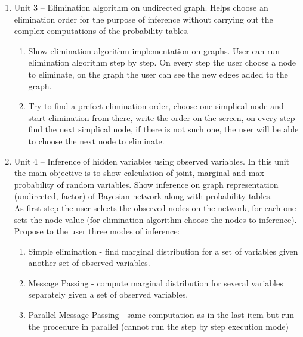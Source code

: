\documentclass{article}
\newcommand{\comment}[2]{
	\todo[color=GreenYellow,inline]{
		\underline{\textbf{#1:}} #2
	}}
\begin{document}
\begin{enumerate}
        \item Unit 3\label{unit3} -- 
            Elimination algorithm on undirected graph. Helps choose an elimination order for the purpose of inference without carrying out the complex computations of the probability tables.
        \begin{enumerate}
            \item Show elimination algorithm implementation on graphs. User can run elimination algorithm step by step. On every step the user choose a node to eliminate, on the graph the user can see the new edges added to the graph.
            \item Try to find a prefect elimination order, choose one simplical node and start elimination from there, write the order on the screen, on every step find the next simplical node, if there is not such one, the user will be able to choose the next node to eliminate.
        \end{enumerate}
        \item Unit 4 --
            Inference of hidden variables using observed variables. In this unit the main objective is to show calculation of joint, marginal and max probability of random variables. Show inference on graph representation (undirected, factor) of Bayesian network along with probability tables.\\

            As first step the user selects the observed nodes on the network, for each one sets the node value (for elimination algorithm choose the nodes to inference).\\

            Propose to the user three modes of inference:
            \begin{enumerate}
                \item Simple elimination - find marginal distribution for a set of variables given another set of observed variables.
                \item Message Passing - compute marginal distribution for several variables separately given a set of observed variables.
                \item Parallel Message Passing - same computation as in the last item but run the procedure in parallel (cannot run the step by step execution mode)
            \end{enumerate}


\end{enumerate}
\end{document}
